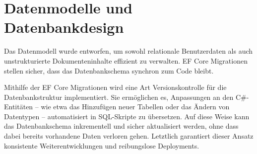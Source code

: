 \section{Datenmodelle und Datenbankdesign}
Das Datenmodell wurde entworfen, um sowohl relationale Benutzerdaten als auch unstrukturierte Dokumenteninhalte effizient zu verwalten. EF Core Migrationen stellen sicher, dass das Datenbankschema synchron zum Code bleibt.

Mithilfe der EF Core Migrationen wird eine Art Versionskontrolle für die Datenbankstruktur implementiert. Sie ermöglichen es, Anpassungen an den C\#-Entitäten – wie etwa das Hinzufügen neuer Tabellen oder das Ändern von Datentypen – automatisiert in SQL-Skripte zu übersetzen. Auf diese Weise kann das Datenbankschema inkrementell und sicher aktualisiert werden, ohne dass dabei bereits vorhandene Daten verloren gehen. Letztlich garantiert dieser Ansatz konsistente Weiterentwicklungen und reibungslose Deployments.

